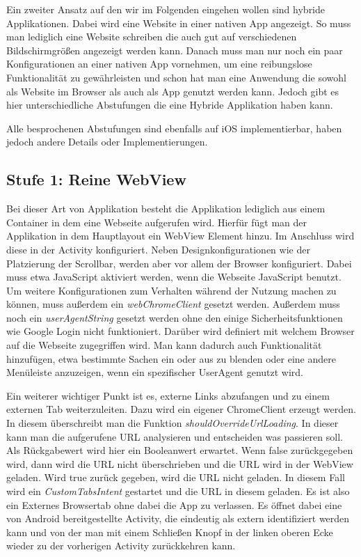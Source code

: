 Ein zweiter Ansatz auf den wir im Folgenden eingehen wollen sind hybride Applikationen. Dabei wird eine Website in einer nativen App angezeigt. So muss man lediglich eine Website schreiben die auch gut auf verschiedenen Bildschirmgrößen angezeigt werden kann. Danach muss man nur noch ein paar Konfigurationen an einer nativen App vornehmen, um eine reibungslose Funktionalität zu gewährleisten und schon hat man eine Anwendung die sowohl als Website im Browser als auch als App genutzt werden kann. Jedoch gibt es hier unterschiedliche Abstufungen die eine Hybride Applikation haben kann.

Alle besprochenen Abstufungen sind ebenfalls auf iOS implementierbar, haben jedoch andere Details oder Implementierungen. 

\subsection{Stufe 1: Reine WebView}
Bei dieser Art von Applikation besteht die Applikation lediglich aus einem Container in dem eine Webseite aufgerufen wird. Hierfür fügt man der Applikation in dem Hauptlayout ein WebView Element hinzu. Im Anschluss wird diese in der Activity konfiguriert. Neben Designkonfigurationen wie der Platzierung der Scrollbar, werden aber vor allem der Browser konfiguriert. Dabei muss etwa JavaScript aktiviert werden, wenn die Webseite JavaScript benutzt. Um weitere Konfigurationen zum Verhalten während der Nutzung machen zu können, muss außerdem ein \textsl{webChromeClient} gesetzt werden. Außerdem muss noch ein \textsl{userAgentString} gesetzt werden ohne den einige Sicherheitsfunktionen wie Google Login nicht funktioniert. Darüber wird definiert mit welchem Browser auf die Webseite zugegriffen wird. Man kann dadurch auch Funktionalität hinzufügen, etwa bestimmte Sachen ein oder aus zu blenden oder eine andere Menüleiste anzuzeigen, wenn ein spezifischer UserAgent genutzt wird.

Ein weiterer wichtiger Punkt ist es, externe Links abzufangen und zu einem externen Tab weiterzuleiten. Dazu wird ein eigener ChromeClient erzeugt werden.  In diesem überschreibt man die Funktion \textsl{shouldOverrideUrlLoading}. In dieser kann man die aufgerufene URL analysieren und entscheiden was passieren soll. Als Rückgabewert wird hier ein Booleanwert erwartet. Wenn false zurückgegeben wird, dann wird die URL nicht überschrieben und die URL wird in der WebView geladen.  Wird true zurück gegeben, wird die URL nicht geladen. In diesem Fall wird ein \textsl{CustomTabsIntent} gestartet und die URL in diesem geladen. Es ist also ein Externes Browsertab ohne dabei die App zu verlassen. Es öffnet dabei eine von Android bereitgestellte Activity, die eindeutig als extern identifiziert werden kann und von der man mit einem Schließen Knopf in der linken oberen Ecke wieder zu der vorherigen Activity zurückkehren kann.

